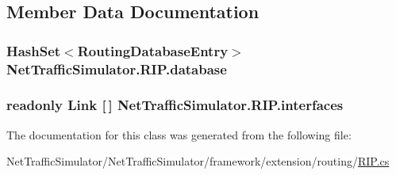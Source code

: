 \subsection{Member Data Documentation}
\hypertarget{classNetTrafficSimulator_1_1RIP_a1bfa7b0dc7c84da3151cd6ee8a77cf30}{
\subsubsection[{database}]{\setlength{\rightskip}{0pt plus 5cm}Hash\-Set$<${\bf Routing\-Database\-Entry}$>$ Net\-Traffic\-Simulator.\-R\-I\-P.\-database\hspace{0.3cm}{\ttfamily [private]}}}\label{classNetTrafficSimulator_1_1RIP_a1bfa7b0dc7c84da3151cd6ee8a77cf30}
\hypertarget{classNetTrafficSimulator_1_1RIP_ae6c643552f57399c710fe228342b0144}{
\subsubsection[{interfaces}]{\setlength{\rightskip}{0pt plus 5cm}readonly {\bf Link} \mbox{[}$\,$\mbox{]} Net\-Traffic\-Simulator.\-R\-I\-P.\-interfaces\hspace{0.3cm}{\ttfamily [private]}}}\label{classNetTrafficSimulator_1_1RIP_ae6c643552f57399c710fe228342b0144}


The documentation for this class was generated from the following file\-:\begin{DoxyCompactItemize}
\item 
Net\-Traffic\-Simulator/\-Net\-Traffic\-Simulator/framework/extension/routing/\hyperlink{RIP_8cs}{R\-I\-P.\-cs}\end{DoxyCompactItemize}
